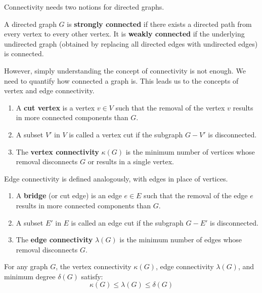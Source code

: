 Connectivity needs two notions for directed graphs.

\begin{definition}
A directed graph $G$ is \textbf{strongly connected} if there exists a directed path from every vertex to every other vertex. It is \textbf{weakly connected} if the underlying undirected graph (obtained by replacing all directed edges with undirected edges) is connected.
\end{definition}

However, simply understanding the concept of connectivity is not enough. We need to quantify how connected a graph is. This leads us to the concepts of vertex and edge connectivity.

\begin{definition}
\begin{enumerate}
    \item A \textbf{cut vertex} is a vertex $v \in V$ such that the removal of the vertex $v$ results in more connected components than $G$.
    \item A subset $V'$ in $V$ is called a vertex cut if the subgraph $G-V'$ is disconnected.
    \item The \textbf{vertex connectivity} $\kappa(G)$ is the minimum number of vertices whose removal disconnects $G$ or results in a single vertex.
\end{enumerate}
\end{definition}

Edge connectivity is defined analogously, with edges in place of vertices.

\begin{definition}
\begin{enumerate}
    \item A \textbf{bridge} (or cut edge) is an edge $e \in E$ such that the removal of the edge $e$ results in more connected components than $G$.
    \item A subset $E'$ in $E$ is called an edge cut if the subgraph $G-E'$ is disconnected.
    \item The \textbf{edge connectivity} $\lambda(G)$ is the minimum number of edges whose removal disconnects $G$.
\end{enumerate}
\end{definition}

\begin{theorem}
For any graph $G$, the vertex connectivity $\kappa(G)$, edge connectivity $\lambda(G)$, and minimum degree $\delta(G)$ satisfy:
\[ \kappa(G) \le \lambda(G) \le \delta(G) \]
\end{theorem}

